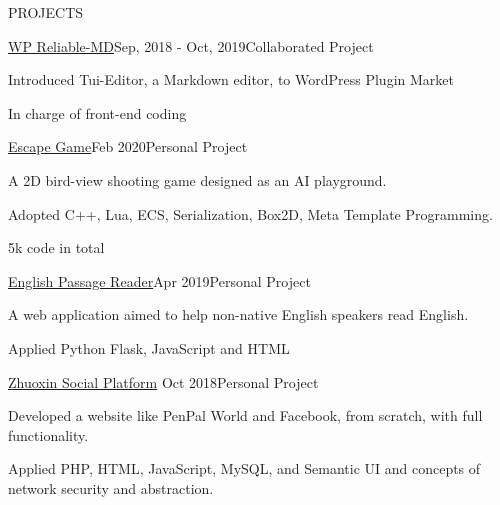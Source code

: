 \documentclass{resume} %
\begin{document}
\begin{rSection}{PROJECTS}
\begin{rSubsection}{\href{https://github.com/jackworkshop/WP-ReliableMD}{WP Reliable-MD}}{Sep, 2018 - Oct, 2019}{Collaborated Project}{}
    \item Introduced Tui-Editor, a Markdown editor, to WordPress Plugin Market
    \item In charge of front-end coding
\end{rSubsection}

\begin{rSubsection}{\href{https://github.com/qiujiangkun/Escape}{Escape Game}}{Feb 2020}{Personal Project}{}
    \item A 2D bird-view shooting game designed as an AI playground.
    \item Adopted C++, Lua, ECS, Serialization, Box2D, Meta Template Programming.
    \item 5k code in total
\end{rSubsection}
\begin{rSubsection}{\href{https://github.com/qiujiangkun/EnglishPassageReader}{English Passage Reader}}{Apr 2019}{Personal Project}{}
    \item A web application aimed to help non-native English speakers read English.
    \item Applied Python Flask, JavaScript and HTML
\end{rSubsection}

\begin{rSubsection}{\href{https://github.com/qiujiangkun/ZhuoxinSocialWebsite}{Zhuoxin Social Platform}} {Oct 2018}{Personal Project}{}

\item Developed a website like PenPal World and Facebook, from scratch, with full functionality.

\item Applied PHP, HTML, JavaScript, MySQL, and Semantic UI and concepts of network security and abstraction.

\end{rSubsection}



\end{rSection}
\end{document}
